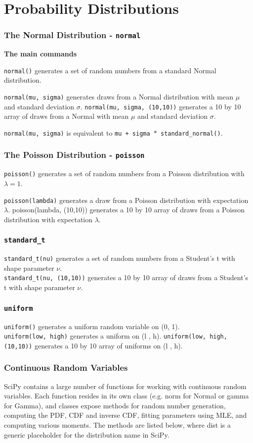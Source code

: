 \documentclass[MASTER.tex]{subfiles}
\begin{document}
 
 

\section{Probability Distributions}

 
 \frametitle{The Normal Distribution  - \texttt{normal}}
  
 \textbf{The main commands}
  
  \texttt{normal()} generates a set of random numbers from a standard Normal distribution.\item \texttt{normal(mu, sigma)} generates draws from
 a Normal distribution with mean $\mu$ and standard deviation $\sigma$.  \texttt{normal(mu, sigma, (10,10))} generates a 10 by 10 array
 of draws from a Normal with mean $\mu$ and standard deviation $\sigma$. 
  
 \texttt{normal(mu, sigma)} is equivalent to \texttt{mu + sigma $\ast$ \texttt{standard\_normal()}}.
  
 
 
 \frametitle{The Poisson Distribution - \texttt{poisson}}
  
  \texttt{poisson()} generates a set of random numbers from a Poisson distribution with $\lambda = 1$.\item  \texttt{poisson(lambda)} generates a draw
  from a Poisson distribution with expectation $\lambda$. 
   poisson(lambda, (10,10)) generates a 10 by 10 array of
  draws from a Poisson distribution with expectation $\lambda$.
  
  

 
 
 \frametitle{\texttt{standard\_t}}
 \texttt{standard\_t(nu)} generates a set of random numbers from a Student’s t with shape parameter $\nu$.\\ \texttt{standard\_t(nu, (10,10))}
 generates a 10 by 10 array of draws from a Student’s t with shape parameter $\nu$.
 
 
 \frametitle{\texttt{uniform}}
 \texttt{uniform()} generates a uniform random variable on (0, 1). \\ \texttt{uniform(low, high)} generates a uniform on
 (l , h). \texttt{uniform(low, high, (10,10))} generates a 10 by 10 array of uniforms on (l , h).
 
 
 
 \frametitle{Continuous Random Variables}
 
 SciPy contains a large number of functions for working with continuous random variables. Each function
 resides in its own class (e.g. norm for Normal or gamma for Gamma), and classes expose methods for random
 number generation, computing the PDF, CDF and inverse CDF, fitting parameters using MLE, and
 computing various moments. The methods are listed below, where dist is a generic placeholder for the
 distribution name in SciPy. 
 
\end{document}
